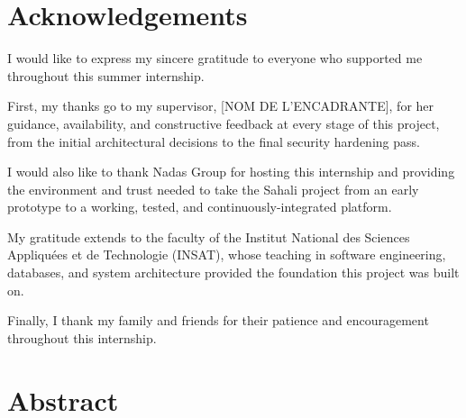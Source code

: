 \documentclass[12pt, a4paper]{report}
\begin{document}
\chapter*{Acknowledgements}

I would like to express my sincere gratitude to everyone who supported me throughout this summer internship.

First, my thanks go to my supervisor, [NOM DE L'ENCADRANTE], for her guidance, availability, and constructive feedback at every stage of this project, from the initial architectural decisions to the final security hardening pass.

I would also like to thank Nadas Group for hosting this internship and providing the environment and trust needed to take the Sahali project from an early prototype to a working, tested, and continuously-integrated platform.

My gratitude extends to the faculty of the Institut National des Sciences Appliquées et de Technologie (INSAT), whose teaching in software engineering, databases, and system architecture provided the foundation this project was built on.

Finally, I thank my family and friends for their patience and encouragement throughout this internship.

\chapter*{Abstract}
\end{document}
